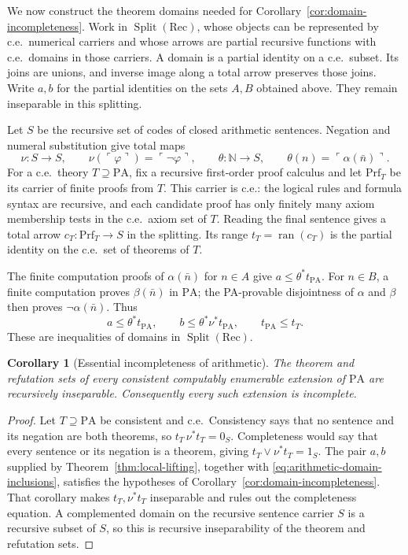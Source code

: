 \documentclass[11pt]{article}
\newtheorem{corollary}[theorem]{Corollary}
\newcommand{\N}{\mathbb N}
\newcommand{\PA}{\mathrm{PA}}
\newcommand{\ran}{\operatorname{ran}}
\begin{document}
We now construct the theorem domains needed for
Corollary~\ref{cor:domain-incompleteness}. Work in
$\operatorname{Split}(\mathrm{Rec})$, whose objects can be represented
by c.e.\ numerical carriers and whose arrows are partial recursive
functions with c.e.\ domains in those carriers. A domain is a partial
identity on a c.e.\ subset. Its joins are unions, and inverse image
along a total arrow preserves those joins. Write $a,b$ for the partial
identities on the sets $A,B$ obtained above. They remain inseparable
in this splitting.

Let $S$ be the recursive set of codes of closed arithmetic sentences.
Negation and numeral substitution give total maps
\[
 \nu:S\to S,\qquad \nu(\ulcorner\varphi\urcorner)
     =\ulcorner\neg\varphi\urcorner,
 \qquad
 \theta:\N\to S,\qquad \theta(n)=\ulcorner\alpha(\bar n)\urcorner.
\]
For a c.e.\ theory $T\supseteq\PA$, fix a recursive first-order proof
calculus and let $\mathrm{Prf}_T$ be its carrier of finite proofs from
$T$. This carrier is c.e.: the logical rules and formula syntax are
recursive, and each candidate proof has only finitely many axiom
membership tests in the c.e.\ axiom set of $T$. Reading the final
sentence gives a total arrow
$c_T:\mathrm{Prf}_T\to S$ in the splitting. Its range
$t_T=\ran(c_T)$ is the partial identity on the c.e.\ set of theorems
of $T$.

The finite computation proofs of $\alpha(\bar n)$ for $n\in A$ give
$a\le\theta^*t_{\PA}$. For $n\in B$, a finite computation proves
$\beta(\bar n)$ in $\PA$; the PA-provable disjointness of $\alpha$
and $\beta$ then proves $\neg\alpha(\bar n)$. Thus
\begin{equation}\label{eq:arithmetic-domain-inclusions}
 a\le\theta^*t_{\PA},\qquad
 b\le\theta^*\nu^*t_{\PA},\qquad
 t_{\PA}\le t_T.
\end{equation}
These are inequalities of domains in $\operatorname{Split}(\mathrm{Rec})$.

\begin{corollary}[Essential incompleteness of arithmetic]\label{cor:arithmetic}
The theorem and refutation sets of every consistent computably
enumerable extension of $\PA$ are recursively inseparable.
Consequently every such extension is incomplete.
\end{corollary}
\begin{proof}
Let $T\supseteq\PA$ be consistent and c.e.\ Consistency says that
no sentence and its negation are both theorems, so
$t_T\,\nu^*t_T=0_S$. Completeness would say that every sentence or
its negation is a theorem, giving $t_T\vee\nu^*t_T=1_S$.
The pair $a,b$ supplied by Theorem~\ref{thm:local-lifting}, together
with \eqref{eq:arithmetic-domain-inclusions}, satisfies the hypotheses
of Corollary~\ref{cor:domain-incompleteness}. That corollary makes
$t_T,\nu^*t_T$ inseparable and rules out the completeness equation.
A complemented domain on the recursive sentence carrier $S$ is a
recursive subset of $S$, so this is recursive inseparability of the
theorem and refutation sets.
\end{proof}
\end{document}
